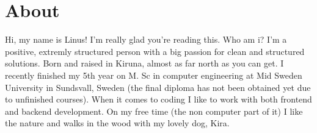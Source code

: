 \section{About}
Hi, my name is Linus! I'm really glad you're reading this.
Who am i? I'm a positive, extremly structured person with a big passion for clean and structured solutions. Born and raised in Kiruna, almost as far north as you can get. I recently finished my 5th  year on M. Sc in computer engineering at Mid Sweden University in Sundsvall, Sweden (the final diploma has not been obtained yet due to unfinished courses). When it comes to coding I like to work with both frontend and backend development. On my free time (the non computer part of it) I like the nature and walks in the wood with my lovely dog, Kira.
